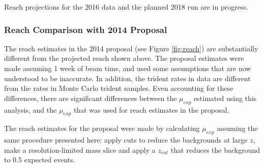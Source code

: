 Reach projections for the 2016 data and the planned 2018 run are in progress.

\subsubsection{Reach Comparison with 2014 Proposal}
\label{sec:proposal_reach}
The reach estimates in the 2014 proposal (see Figure \ref{fig:reach}) are substantially different from the projected reach shown above.
The proposal estimates were made assuming 1 week of beam time, and used some assumptions that are now understood to be inaccurate.
In addition, the trident rates in data are different from the rates in Monte Carlo trident samples.
Even accounting for these differences, there are significant differences between the $\mu_{exp}$ estimated using this analysis, and the $\mu_{exp}$ that was used for reach estimates in the proposal.

The reach estimates for the proposal were made by calculating $\mu_{exp}$ assuming the same procedure presented here: apply cuts to reduce the backgrounds at large $z$, make a resolution-limited mass slice and apply a $z_{cut}$ that reduces the background to 0.5 expected events.


